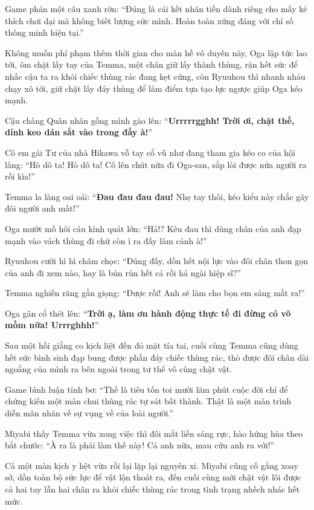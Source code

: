 \documentclass[../main.tex]{subfiles}
\begin{document}
Game phán một câu xanh rờn: ``Đúng là cái kết nhãn tiền dành riêng cho mấy kẻ thích chơi dại mà không biết lượng sức mình. Hoàn toàn xứng đáng với chỉ số thông minh hiện tại.''

Không muốn phí phạm thêm thời gian cho màn hề vô duyên này, Oga lập tức lao tới, ôm chặt lấy tay của Temma, một chân giữ lấy thành thùng, rặn hết sức để nhấc cậu ta ra khỏi chiếc thùng rác đang kẹt cứng, còn Ryuuhou thì nhanh nhảu chạy xô tới, giữ chặt lấy đáy thùng để làm điểm tựa tạo lực ngược giúp Oga kéo mạnh.


Cậu chàng Quân nhân gồng mình gào lên: ``\textbf{Urrrrrgghh! Trời ơi, chặt thế, dính keo dán sắt vào trong đấy à!}''

Cô em gái Tư của nhà Hikawa vỗ tay cổ vũ như đang tham gia kéo co của hội làng: ``Hò dô ta! Hò dô ta! Cố lên chút nữa đi Oga-san, sắp lòi được nửa người ra rồi kìa!''

Temma la làng oai oái: ``\textbf{Đau đau đau đau!} Nhẹ tay thôi, kéo kiểu này chắc gãy đôi người anh mất!''

Oga mướt mồ hôi cáu kỉnh quát lớn: ``Hả!? Kêu đau thì dùng chân của anh đạp mạnh vào vách thùng đi chứ còn ì ra đấy làm cảnh à!''

Ryuuhou cười hì hì châm chọc: ``Đúng đấy, dồn hết nội lực vào đôi chân thon gọn của anh đi xem nào, hay là bủn rủn hết cả rồi hả ngài hiệp sĩ?''

Temma nghiến răng gằn giọng: ``Được rồi! Anh sẽ làm cho bọn em sáng mắt ra!''

Oga gân cổ thét lên: ``\textbf{Trời ạ, làm ơn hành động thực tế đi đừng có võ mồm nữa! Urrrghhh!}''

Sau một hồi giằng co kịch liệt đến đỏ mặt tía tai, cuối cùng Temma cũng dùng hết sức bình sinh đạp bung được phần đáy chiếc thùng rác, thò được đôi chân dài ngoằng của mình ra bên ngoài trong tư thế vô cùng chật vật.

Game bình luận tỉnh bơ: ``Thế là tiêu tốn toi mười lăm phút cuộc đời chỉ để chứng kiến một màn chui thùng rác tự sát bất thành. Thật là một màn trình diễn mãn nhãn về sự vụng về của loài người.''

Miyabi thấy Temma vừa xong việc thì đôi mắt liền sáng rực, hào hứng hùa theo bắt chước: ``À ra là phải làm thế này! Cả anh nữa, mau cứu anh ra với!''

Cả một màn kịch y hệt vừa rồi lại lặp lại nguyên xi. Miyabi cũng cố gắng xoay sở, dồn toàn bộ sức lực để vật lộn thoát ra, đến cuối cùng mới chật vật lôi được cả hai tay lẫn hai chân ra khỏi chiếc thùng rác trong tình trạng nhếch nhác hết mức.
\end{document}
